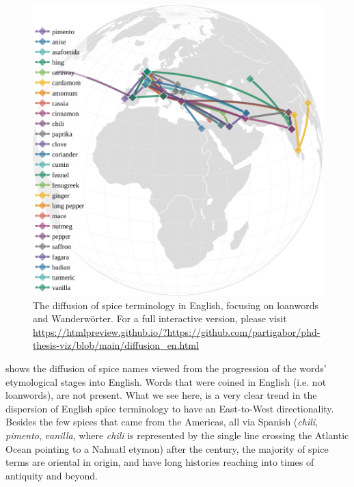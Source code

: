 \begin{figure}[ht!]
  \includegraphics[width=\linewidth]{imgs/plots/diffusion_en.pdf}
  \caption{The diffusion of spice terminology in English, focusing on loanwords and Wanderwörter. For a full interactive version, please visit \url{https://htmlpreview.github.io/?https://github.com/partigabor/phd-thesis-viz/blob/main/diffusion_en.html}}
  \label{fig:diffusion_en}
\end{figure}

 shows the diffusion of spice names viewed from the progression of the words' etymological stages into English. Words that were coined in English (i.e. not loanwords), are not present. What we see here, is a very clear trend in the dispersion of English spice terminology to have an East-to-West directionality. Besides the few spices that came from the Americas, all via Spanish (\textit{chili}, \textit{pimento}, \textit{vanilla}, where \textit{chili} is represented by the single line crossing the Atlantic Ocean pointing to a Nahuatl etymon) after the  century, the majority of spice terms are oriental in origin, and have long histories reaching into times of antiquity and beyond. 



